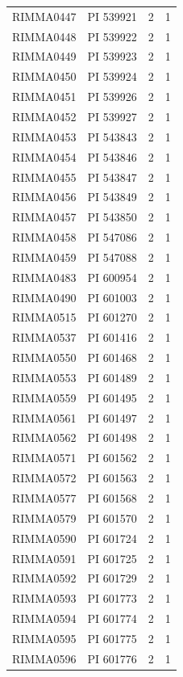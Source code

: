 \documentclass[11pt]{article}
\newcounter{rowno}
\begin{document}
\begin{scriptsize}
\begin{longtable}{>{\stepcounter{rowno}}cccc}
    RIMMA0447 & PI	539921 & 2     & 1 \\
    RIMMA0448 & PI	539922 & 2     & 1 \\
    RIMMA0449 & PI	539923 & 2     & 1 \\
    RIMMA0450 & PI	539924 & 2     & 1 \\
    RIMMA0451 & PI	539926 & 2     & 1 \\
    RIMMA0452 & PI	539927 & 2     & 1 \\
    RIMMA0453 & PI	543843 & 2     & 1 \\
    RIMMA0454 & PI	543846 & 2     & 1 \\
    RIMMA0455 & PI	543847 & 2     & 1 \\
    RIMMA0456 & PI	543849 & 2     & 1 \\
    RIMMA0457 & PI	543850 & 2     & 1 \\
    RIMMA0458 & PI	547086 & 2     & 1 \\
    RIMMA0459 & PI	547088 & 2     & 1 \\
    RIMMA0483 & PI	600954 & 2     & 1 \\
    RIMMA0490 & PI	601003 & 2     & 1 \\
    RIMMA0515 & PI	601270 & 2     & 1 \\
    RIMMA0537 & PI	601416 & 2     & 1 \\
    RIMMA0550 & PI	601468 & 2     & 1 \\
    RIMMA0553 & PI	601489 & 2     & 1 \\
    RIMMA0559 & PI	601495 & 2     & 1 \\
    RIMMA0561 & PI	601497 & 2     & 1 \\
    RIMMA0562 & PI	601498 & 2     & 1 \\
    RIMMA0571 & PI	601562 & 2     & 1 \\
    RIMMA0572 & PI	601563 & 2     & 1 \\
    RIMMA0577 & PI	601568 & 2     & 1 \\
    RIMMA0579 & PI	601570 & 2     & 1 \\
    RIMMA0590 & PI	601724 & 2     & 1 \\
    RIMMA0591 & PI	601725 & 2     & 1 \\
    RIMMA0592 & PI	601729 & 2     & 1 \\
    RIMMA0593 & PI	601773 & 2     & 1 \\
    RIMMA0594 & PI	601774 & 2     & 1 \\
    RIMMA0595 & PI	601775 & 2     & 1 \\
    RIMMA0596 & PI	601776 & 2     & 1 \\

\end{longtable}
\end{scriptsize}
\end{document}
